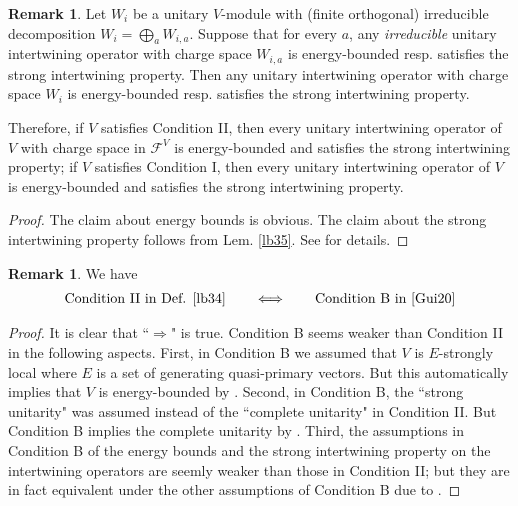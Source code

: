\documentclass[11pt,b5paper,notitlepage]{article}
\theoremstyle{definition}
\newtheorem{rem}[df]{Remark}
\theoremstyle{plain}
\newcommand{\mc}{\mathcal}
\numberwithin{equation}{section}
\begin{document}
\begin{rem}\label{lb46}
Let $W_i$ be a unitary $V$-module with (finite orthogonal) irreducible decomposition $W_i=\bigoplus_a W_{i,a}$. Suppose that for every $a$, any \textit{irreducible} unitary intertwining operator with charge space $W_{i,a}$ is energy-bounded resp. satisfies the strong intertwining property. Then any unitary intertwining operator with charge space $W_i$ is energy-bounded resp. satisfies the strong intertwining property.

Therefore, if $V$ satisfies Condition II, then every unitary intertwining operator of $V$ with charge space in $\mc F^V$ is energy-bounded and satisfies the strong intertwining property; if $V$ satisfies Condition I, then every unitary intertwining operator of $V$ is energy-bounded and satisfies the strong intertwining property.
\end{rem}


\begin{proof}
The claim about energy bounds is obvious. The claim about the strong intertwining property follows from Lem. \ref{lb35}. See \cite[Rem. 2.3.10]{Gui20} for details.
\end{proof}



\begin{rem}
We have
\begin{align*}
\text{Condition II in Def. \ref{lb34}}\qquad\Longleftrightarrow\qquad\text{Condition B in \cite[Sec. 2.4]{Gui20}}
\end{align*}
\end{rem}



\begin{proof}
It is clear that ``$\Rightarrow$" is true. Condition B seems weaker than Condition II in the following aspects. First, in Condition B we assumed that $V$ is $E$-strongly local where $E$ is a set of generating quasi-primary vectors. But this automatically implies that $V$ is energy-bounded by \cite[Thm. 8.1]{CKLW18}. Second, in Condition B, the ``strong unitarity" was assumed instead of the ``complete unitarity" in Condition II. But Condition B implies the complete unitarity by \cite[Thm. 2.4.1]{Gui20}. Third, the assumptions in Condition B of the energy bounds and the strong intertwining property on the intertwining operators  are seemly weaker than those in Condition II; but they are in fact equivalent under the other assumptions of Condition B due to \cite[Prop. 2.5.10]{Gui20}.
\end{proof}
\end{document}
